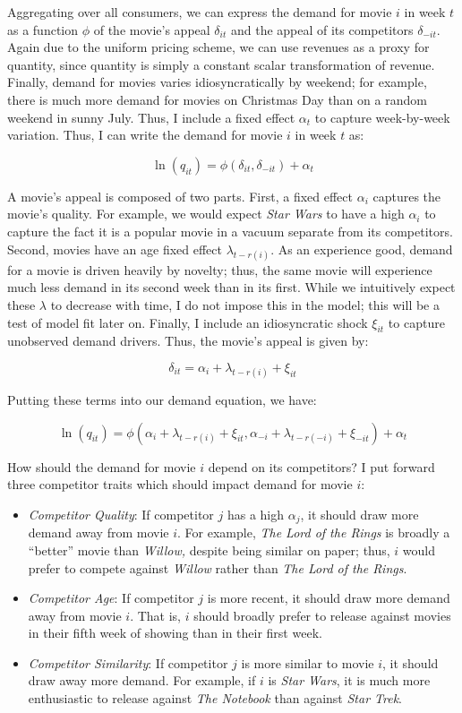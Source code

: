 \documentclass{article}
\begin{document}
Aggregating over all consumers, we can express the demand for movie $i$ in week $t$ as a function $\phi$ of the movie's appeal $\delta_{it}$ and the appeal of its competitors $\delta_{-it}$. Again due to the uniform pricing scheme, we can use revenues as a proxy for quantity, since quantity is simply a constant scalar transformation of revenue. Finally, demand for movies varies idiosyncratically by weekend; for example, there is much more demand for movies on Christmas Day than on a random weekend in sunny July. Thus, I include a fixed effect $\alpha_t$ to capture week-by-week variation. Thus, I can write the demand for movie $i$ in week $t$ as:

$$\ln(q_{it}) = \phi(\delta_{it}, \delta_{-it}) + \alpha_t$$

A movie's appeal is composed of two parts. First, a fixed effect $\alpha_i$ captures the movie's quality. For example, we would expect \emph{Star Wars} to have a high $\alpha_i$ to capture the fact it is a popular movie in a vacuum separate from its competitors. Second, movies have an age fixed effect $\lambda_{t - r(i)}$. As an experience good, demand for a movie is driven heavily by novelty; thus, the same movie will experience much less demand in its second week than in its first. While we intuitively expect these $\lambda$ to decrease with time, I do not impose this in the model; this will be a test of model fit later on. Finally, I include an idiosyncratic shock $\xi_{it}$ to capture unobserved demand drivers. Thus, the movie's appeal is given by:

$$\delta_{it} = \alpha_i + \lambda_{t - r(i)} + \xi_{it}$$

Putting these terms into our demand equation, we have:

$$\ln(q_{it}) = \phi(\alpha_i + \lambda_{t - r(i)} + \xi_{it}, \alpha_{-i} + \lambda_{t - r(-i)} + \xi_{-it}) + \alpha_t$$

How should the demand for movie $i$ depend on its competitors? I put forward three competitor traits which should impact demand for movie $i$:
\begin{itemize}
    \item \emph{Competitor Quality}: If competitor $j$ has a high $\alpha_j$, it should draw more demand away from movie $i$. For example, \emph{The Lord of the Rings} is broadly a ``better'' movie than \emph{Willow,} despite being similar on paper; thus, $i$ would prefer to compete against \emph{Willow} rather than \emph{The Lord of the Rings}.
    \item \emph{Competitor Age}: If competitor $j$ is more recent, it should draw more demand away from movie $i$. That is, $i$ should broadly prefer to release against movies in their fifth week of showing than in their first week.
    \item \emph{Competitor Similarity}: If competitor $j$ is more similar to movie $i$, it should draw away more demand. For example, if $i$ is \emph{Star Wars}, it is much more enthusiastic to release against \emph{The Notebook} than against \emph{Star Trek}.
\end{itemize}
\end{document}
